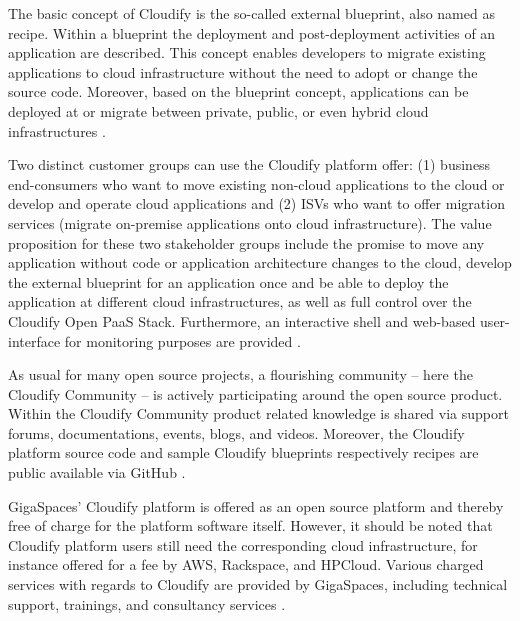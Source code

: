 The basic concept of Cloudify is the so-called external blueprint, also named as recipe. Within a blueprint the deployment and post-deployment activities of an application are described. This concept enables developers to migrate existing applications to cloud infrastructure without the need to adopt or change the source code. Moreover, based on the blueprint concept, applications can be deployed at or migrate between private, public, or even hybrid cloud infrastructures \citep{GigaSpaces2013a}.

Two distinct customer groups can use the Cloudify platform offer: (1) business end-consumers who want to move existing non-cloud applications to the cloud or develop and operate cloud applications and (2) \acp{ISV} who want to offer migration services (migrate on-premise applications onto cloud infrastructure). The value proposition for these two stakeholder groups include the promise to move any application without code or application architecture changes to the cloud, develop the external blueprint for an application once and be able to deploy the application at different cloud infrastructures, as well as full control over the Cloudify Open \ac{PaaS} Stack. Furthermore, an interactive shell and web-based user-interface for monitoring purposes are provided \citep{GigaSpaces2013a}.

As usual for many open source projects, a flourishing community -- here the Cloudify Community -- is actively participating around the open source product. Within the Cloudify Community product related knowledge is shared via support forums, documentations, events, blogs, and videos. Moreover, the Cloudify platform source code and sample Cloudify blueprints respectively recipes are public available via GitHub \citep{GigaSpaces2013b,GitHub2013,GitHub2013a}.

GigaSpaces' Cloudify platform is offered as an open source platform and thereby free of charge for the platform software itself. However, it should be noted that Cloudify platform users still need the corresponding cloud infrastructure, for instance offered for a fee by \ac{AWS}, Rackspace, and HPCloud. Various charged services with regards to Cloudify are provided by GigaSpaces, including technical support, trainings, and consultancy services \citep{GigaSpaces2013a}.




